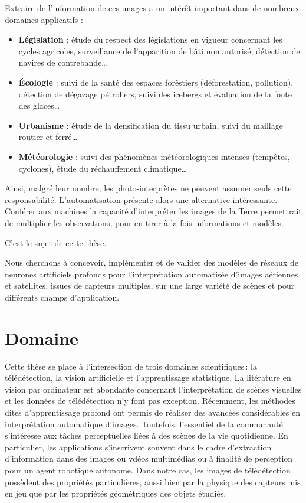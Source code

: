 Extraire de l'information de ces images a un intérêt important dans de nombreux domaines applicatifs :
\begin{itemize}
	\item \textbf{Législation} : étude du respect des législations en vigueur concernant les cycles agricoles, surveillance de l'apparition de bâti non autorisé, détection de navires de contrebande\dots
	\item \textbf{Écologie} : suivi de la santé des espaces forêstiers (déforestation, pollution), détection de dégazage pétroliers, suivi des icebergs et évaluation de la fonte des glaces\dots
	\item \textbf{Urbanisme} : étude de la densification du tissu urbain, suivi du maillage routier et ferré\dots
	\item \textbf{Météorologie} : suivi des phénomènes météorologiques intenses (tempêtes, cyclones), étude du réchauffement climatique\dots
\end{itemize}

Ainsi, malgré leur nombre, les photo-interprètes ne peuvent assumer seuls cette responsabilité. L'automatisation présente alors une alternative intéressante. Conférer aux machines la capacité d'interpréter les images de la Terre permettrait de multiplier les observations, pour en tirer à la fois informations et modèles.

C'est le sujet de cette thèse.

Nous cherchons à concevoir, implémenter et de valider des modèles de réseaux de neurones artificiels profonds pour l'interprétation automatisée d'images aériennes et satellites, issues de capteurs multiples, sur une large variété de scènes et pour différents champs d'application.

\begin{figure}[t]
    \centering
    \def\svgwidth{\columnwidth}
    
\end{figure}

\section{Domaine}

Cette thèse se place à l'intersection de trois domaines scientifiques\,: la télédétection, la vision artificielle et l'apprentissage statistique. La litérature en vision par ordinateur est abondante concernant l'interprétation de scènes visuelles et les données de télédétection n'y font pas exception. Récemment, les méthodes dites d'apprentissage profond ont permis de réaliser des avancées considérables en interprétation automatique d'images. Toutefois, l'essentiel de la communauté s'intéresse aux tâches perceptuelles liées à des scènes de la vie quotidienne. En particulier, les applications s'inscrivent souvent dans le cadre d'extraction d'information dans des images ou vdéos multimédias ou à finalité de perception pour un agent robotique autonome. Dans notre cas, les images de télédétection possèdent des propriétés particulières, aussi bien par la physique des capteurs mis en jeu que par les propriétés géométriques des objets étudiés.

